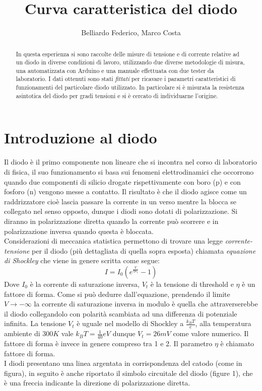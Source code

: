 \documentclass[a4paper,10pt]{article}
\title{Curva caratteristica del diodo}
\author{Belliardo Federico, Marco Costa}
\begin{document}
\maketitle

\begin{abstract}
In questa esperienza si sono raccolte delle misure di tensione e di corrente relative ad un diodo in diverse condizioni di lavoro, utilizzando due diverse metodologie di misura, 
una automatizzata con Arduino e una manuale effettuata con due tester da laboratorio. I dati ottenuti sono stati \emph{fittati} per ricavare i parametri caratteristici di funzionamenti del particolare diodo utilizzato. In particolare si è misurata la resistenza asintotica del diodo per gradi tensioni e si è cercato di individuarne l'origine.
\end{abstract}

\section{Introduzione al diodo}
Il diodo è il primo componente non lineare che si incontra nel corso di laboratorio di fisica, il suo funzionamento si basa sui fenomeni elettrodinamici che occorrono quando due 
componenti di silicio drogate rispettivamente con boro (p) e con fosforo (n) vengono messe a contatto. Il risultato è che il diodo agisce come un raddrizzatore cioè lascia passare la corrente in un verso mentre la blocca
se collegato nel senso opposto, dunque i diodi sono dotati di polarizzazione. Si diranno in polarizzazione diretta quando la corrente può scorrere e in polarizzazione inversa quando questa è bloccata.
\\
Considerazioni di meccanica statistica permettono di trovare una legge \emph{corrente-tensione} per il diodo (più dettagliata di quella sopra esposta) chiamata \emph{equazione di Shockley} che viene
in genere scritta come segue: 
\begin{equation}
 I = I_0 (e^{\frac{V}{\eta V_t}}-1)
\end{equation}
Dove $I_0$ è la corrente di saturazione inversa, $V_t$ è la tensione di threshold e $\eta$ è un fattore di forma.
Come si può dedurre dall'equazione, prendendo il limite $V \longrightarrow -\infty$ la corrente di saturazione inversa in modulo è quella che attraverserebbe il diodo 
collegandolo con polarità scambiata ad una differenza di potenziale infinita.
La tensione $V_t$ è uguale nel modello di Shockley a $\frac{k_B T}{e}$, alla temperatura ambiente di $300 K$ vale $k_B T = \frac{1}{40} eV$ dunque $V_t = 26 mV$ come valore numerico.
Il fattore di forma è invece in genere compreso tra 1 e 2.
Il parametro $\eta$ è chiamato fattore di forma.
\\
I diodi presentano una linea argentata in corrispondenza del catodo (come in figura), in seguito è anche riportato il simbolo circuitale del diodo (figure 1), che è una freccia indicante 
la direzione di polarizzazione diretta.
\end{document}
